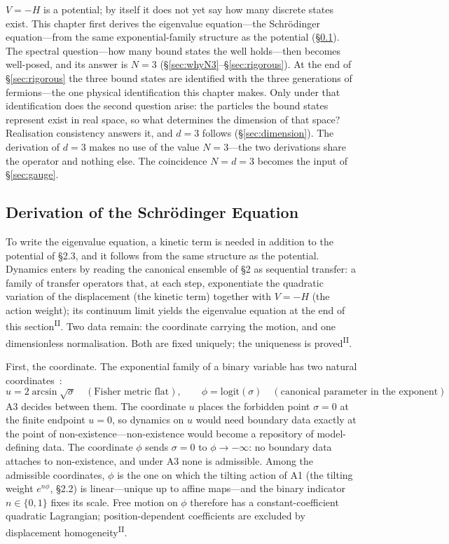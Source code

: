 \documentclass[12pt,a4paper]{article}
\newcommand{\PII}{\textsuperscript{\textup{II}}}
\begin{document}
$V = -H$ is a potential; by itself it does not yet say how many discrete states exist. This chapter first derives the eigenvalue equation---the Schr\"odinger equation---from the same exponential-family structure as the potential (\S\ref{sec:kinetic}). The spectral question---how many bound states the well holds---then becomes well-posed, and its answer is $N = 3$ (\S\ref{sec:whyN3}--\S\ref{sec:rigorous}). At the end of \S\ref{sec:rigorous} the three bound states are identified with the three generations of fermions---the one physical identification this chapter makes. Only under that identification does the second question arise: the particles the bound states represent exist in real space, so what determines the dimension of that space? Realisation consistency answers it, and $d = 3$ follows (\S\ref{sec:dimension}). The derivation of $d = 3$ makes no use of the value $N = 3$---the two derivations share the operator and nothing else. The coincidence $N = d = 3$ becomes the input of \S\ref{sec:gauge}.

\subsection{Derivation of the Schr\"odinger Equation}\label{sec:kinetic}

To write the eigenvalue equation, a kinetic term is needed in addition to the potential of \S2.3, and it follows from the same structure as the potential. Dynamics enters by reading the canonical ensemble of \S2 as sequential transfer: a family of transfer operators that, at each step, exponentiate the quadratic variation of the displacement (the kinetic term) together with $V = -H$ (the action weight); its continuum limit yields the eigenvalue equation at the end of this section\PII{}. Two data remain: the coordinate carrying the motion, and one dimensionless normalisation. Both are fixed uniquely; the uniqueness is proved\PII{}.

First, the coordinate. The exponential family of a binary variable has two natural coordinates~\cite{cencov,amari,ay}:
\[u = 2\arcsin\sqrt{\sigma}\quad(\text{Fisher metric flat}),\qquad \phi = \mathrm{logit}(\sigma)\quad(\text{canonical parameter in the exponent})\]
A3 decides between them. The coordinate $u$ places the forbidden point $\sigma = 0$ at the finite endpoint $u = 0$, so dynamics on $u$ would need boundary data exactly at the point of non-existence---non-existence would become a repository of model-defining data. The coordinate $\phi$ sends $\sigma = 0$ to $\phi \to -\infty$: no boundary data attaches to non-existence, and under A3 none is admissible. Among the admissible coordinates, $\phi$ is the one on which the tilting action of A1 (the tilting weight $e^{n\phi}$, \S2.2) is linear---unique up to affine maps---and the binary indicator $n \in \{0,1\}$ fixes its scale. Free motion on $\phi$ therefore has a constant-coefficient quadratic Lagrangian; position-dependent coefficients are excluded by displacement homogeneity\PII{}.
\end{document}
